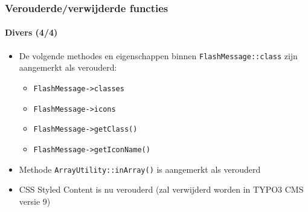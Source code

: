 \begin{frame}[fragile]
	\frametitle{Verouderde/verwijderde functies}
	\framesubtitle{Divers (4/4)}

	\begin{itemize}

		\item De volgende methodes en eigenschappen binnen \texttt{FlashMessage::class}
			zijn aangemerkt als verouderd:

			\begin{itemize}
				\item \texttt{FlashMessage->classes}
				\item \texttt{FlashMessage->icons}
				\item \texttt{FlashMessage->getClass()}
				\item \texttt{FlashMessage->getIconName()}
			\end{itemize}

		\item Methode \texttt{ArrayUtility::inArray()} is aangemerkt als verouderd

		\item CSS Styled Content is nu verouderd\newline
			\small(zal verwijderd worden in TYPO3 CMS versie 9)\normalsize

	\end{itemize}

\end{frame}

